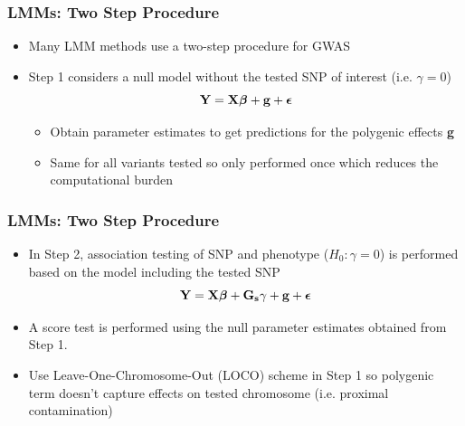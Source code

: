 \documentclass{beamer}
\newcommand{\bg}{\mathbf{g}}
\newcommand{\bepsilon}{\mbox{\boldmath$\epsilon$}}
\begin{document}
\begin{frame}
\frametitle{\bf  LMMs: Two Step Procedure }
\begin{itemize}
\item Many LMM methods use a two-step procedure for GWAS
\item Step 1 considers a null model without the tested SNP of interest (i.e. $\gamma = 0$)
$$ \mathbf{Y}= \mathbf{X}\boldsymbol{\beta} +  \bg  + \bepsilon  $$
\begin{itemize}
	\item Obtain parameter estimates to get predictions for the polygenic effects \textbf{g}
\item  Same for all variants tested so only performed once which reduces the computational burden
\end{itemize}
\end{itemize}
\end{frame}



\begin{frame}
\frametitle{\bf  LMMs: Two Step Procedure }
\begin{itemize}
\item In Step 2, association testing of SNP and phenotype ($H_0:\gamma=0$)  is performed based on the model including the tested SNP
$$ \mathbf{Y}= \mathbf{X}\boldsymbol{\beta} + \mathbf{G_s}\gamma +  \bg  + \bepsilon $$
\item A score test is performed using the null parameter estimates obtained from Step 1.
\item Use Leave-One-Chromosome-Out (LOCO) scheme in Step 1 so polygenic term doesn't capture effects on tested chromosome (i.e. proximal contamination)
\end{itemize}
\end{frame}
\end{document}

